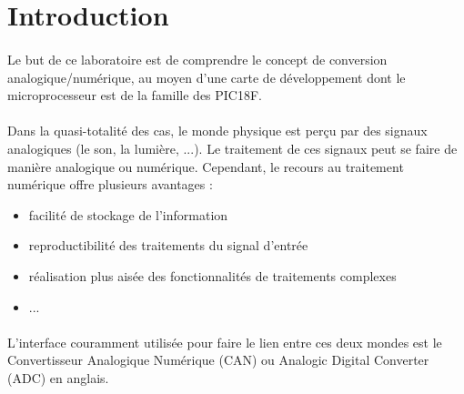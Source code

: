 \section{Introduction}
\paragraph{}
Le but de ce laboratoire est de comprendre le concept de conversion analogique/numérique, au moyen d'une carte de développement dont le microprocesseur est de la famille des PIC18F.
\paragraph{}
Dans la quasi-totalité des cas, le monde physique est perçu par des signaux analogiques (le son, la lumière, ...). Le traitement de ces signaux peut se faire de manière analogique ou numérique. Cependant, le recours au traitement numérique offre plusieurs avantages :
\begin{itemize}
\item facilité de stockage de l'information
\item reproductibilité des traitements du signal d'entrée
\item réalisation plus aisée des fonctionnalités de traitements complexes
\item ...
\end{itemize}
\paragraph{}
L'interface couramment utilisée pour faire le lien entre ces deux mondes est le Convertisseur Analogique Numérique (CAN) ou Analogic Digital Converter (ADC) en anglais.
